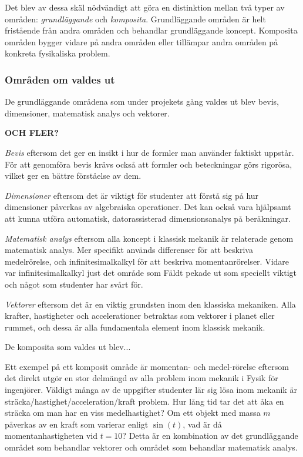 \begin{draft}
Det blev av dessa skäl nödvändigt att göra en distinktion mellan två typer av områden: \textit{grundläggande} och \textit{komposita}. Grundläggande områden är helt fristående från andra områden och behandlar grundläggande koncept. Komposita områden bygger vidare på andra områden eller tillämpar andra områden på konkreta fysikaliska problem.

\subsubsection*{Områden om valdes ut}

De grundläggande områdena som under projekets gång valdes ut blev bevis, dimensioner, matematisk analys och vektorer. 

\textbf{OCH FLER?}

\textit{Bevis} eftersom det ger en insikt i hur de formler man använder
faktiskt uppstår. För att genomföra bevis krävs också att formler och
beteckningar görs rigorösa, vilket ger en bättre förståelse av dem.

\textit{Dimensioner} eftersom det är viktigt för studenter att förstå sig på
hur dimensioner påverkas av algebraiska operationer. Det kan också vara
hjälpsamt att kunna utföra automatisk, datorassisterad dimensionsanalys på
beräkningar.

\textit{Matematisk analys} eftersom alla koncept i klassisk mekanik är
relaterade genom matematisk analys. Mer specifikt används differenser för att
beskriva medelrörelse, och infinitesimalkalkyl för att beskriva
momentanrörelser. Vidare var infinitesimalkalkyl just det område som Fäldt
pekade ut som speciellt viktigt och något som studenter har svårt för.

\textit{Vektorer} eftersom det är en viktig grundsten inom den klassiska
mekaniken. Alla krafter, hastigheter och accelerationer betraktas som vektorer i
planet eller rummet, och dessa är alla fundamentala element inom klassisk
mekanik.

\end{draft}
\begin{binge}

De komposita som valdes ut blev...

Ett exempel på ett komposit område är momentan- och medel-rörelse eftersom det
direkt utgör en stor delmängd av alla problem inom mekanik i Fysik för
ingenjörer. Väldigt många av de uppgifter studenter lär sig lösa inom mekanik
är sträcka/hastighet/acceleration/kraft problem. Hur lång tid tar det att åka
en sträcka om man har en viss medelhastighet? Om ett objekt med massa $m$
påverkas av en kraft som varierar enligt $\sin(t)$, vad är då
momentanhastigheten vid $t=10$? Detta är en kombination av det grundläggande
området som behandlar vektorer och området som behandlar matematisk analys.

\end{binge}

